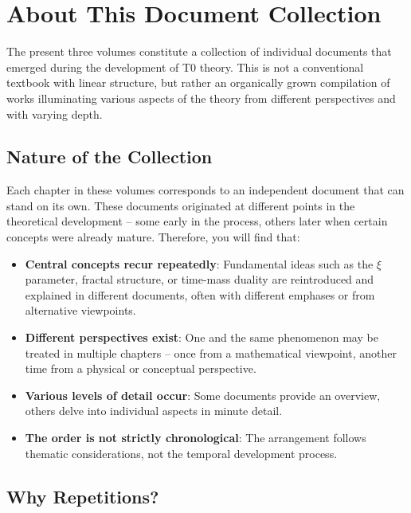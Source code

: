 \section*{About This Document Collection}

The present three volumes constitute a collection of individual documents that emerged during the development of T0 theory. This is not a conventional textbook with linear structure, but rather an organically grown compilation of works illuminating various aspects of the theory from different perspectives and with varying depth.

\subsection*{Nature of the Collection}

Each chapter in these volumes corresponds to an independent document that can stand on its own. These documents originated at different points in the theoretical development -- some early in the process, others later when certain concepts were already mature. Therefore, you will find that:

\begin{itemize}
\item \textbf{Central concepts recur repeatedly}: Fundamental ideas such as the $\xi$ parameter, fractal structure, or time-mass duality are reintroduced and explained in different documents, often with different emphases or from alternative viewpoints.

\item \textbf{Different perspectives exist}: One and the same phenomenon may be treated in multiple chapters -- once from a mathematical viewpoint, another time from a physical or conceptual perspective.

\item \textbf{Various levels of detail occur}: Some documents provide an overview, others delve into individual aspects in minute detail.

\item \textbf{The order is not strictly chronological}: The arrangement follows thematic considerations, not the temporal development process.
\end{itemize}

\subsection*{Why Repetitions?}

